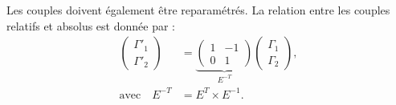 \documentclass[10pt,a4paper,twocolumn]{article}
\begin{document}
Les couples doivent également être reparamétrés. La relation entre les couples relatifs 
et absolus est donnée par :
\begin{equation}
  \begin{aligned}
    \begin{pmatrix}
      \Gamma'_1 \\
      \Gamma'_2
    \end{pmatrix}
    &=
    \underbrace{
      \begin{pmatrix}
        1 & -1 \\
        0 & 1
      \end{pmatrix}
    }_{E^{-T}}
    \begin{pmatrix}
      \Gamma_1\\
      \Gamma_2
    \end{pmatrix}, \\
    \text{avec} \quad E^{-T}
    &=
    E^{T} \times E^{-1}.
  \end{aligned}
\label{eq:transformation_gamma}
\end{equation}
\end{document}
